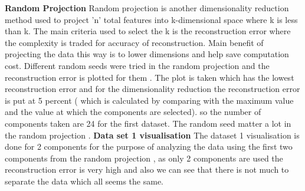 \documentclass[a4paper,12pt]{article}
\begin{document}
\textbf{ Random Projection} Random projection is another dimensionality reduction method used to project ’n’ total features into k-dimensional space where k is less than k. The main criteria used to select the k is the reconstruction error where the complexity is traded for accuracy of reconstruction. Main benefit of projecting the data this way is to lower dimensions and help save computation cost. Different random seeds were tried in the random projection and the reconstruction error is plotted for them . The plot is taken which has the lowest reconstruction error and for the dimensionality reduction the reconstruction error is put at 5 percent ( which is calculated by comparing with the maximum value and the value at which the components are selected). so the number of components taken are 24 for the first dataset. The random seed matter a lot in the random projection .
\textbf{Data set 1 visualisation} The dataset 1 visualisation is done for 2 components for the purpose of analyzing the data using the first two components from the random projection , as only 2 components are used the reconstruction error is very high and also we can see that there is not much to separate the data which all seems the same.
\end{document}
